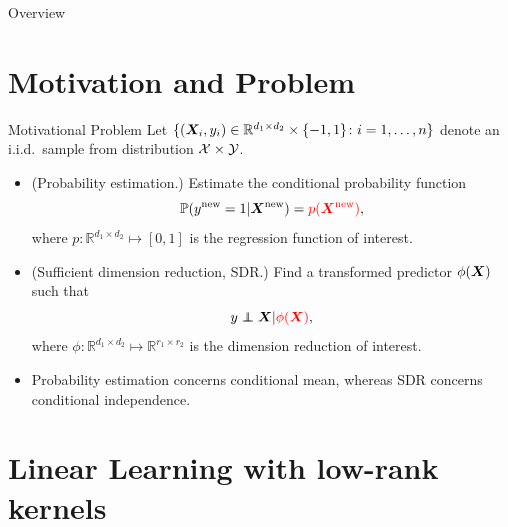 \documentclass[compress,dvipsnames]{beamer}
\let\olditem\item
\renewcommand\item{\olditem\justifying}
\newcommand{\ind}{\perp\!\!\!\!\perp}
\begin{document}
\begin{frame}{Overview}
\tableofcontents
\end{frame}

\section{Motivation and Problem}
\begin{frame}{Motivational Problem}
Let $\{ (\bm{X}_i, y_i) \in \mathbb{R}^{d_1\times d_2}\times \{-1,1\}\colon i=1,\ldots,n\}$ denote an i.i.d.\ sample from distribution ${\mathcal X}\times {\mathcal Y}$. 
\begin{itemize}
\item (Probability estimation.) Estimate the conditional probability function
\[
\mathbb{P}(y^{\text{new}}=1|\bm{X}^{\text{new}})={\color{red}p(\bm{X}^{\text{new}})},
\]
where $p\colon \mathbb{R}^{d_1\times d_2}\mapsto [0,1]$ is the regression function of interest. 
\item (Sufficient dimension reduction, SDR.) Find a transformed predictor $\phi(\bm{X})$ such that
\[
y \ind \mX \large|{\color{red}\phi(\mX)},
\]
where $\phi\colon \mathbb{R}^{d_1\times d_2}\mapsto \mathbb{R}^{r_1\times r_2}$ is the dimension reduction of interest. 
\item Probability estimation concerns {\color{red}conditional mean}, whereas SDR concerns {\color{red}conditional independence}. 
\end{itemize}
\end{frame}

\section{Linear Learning with low-rank kernels}
\end{document}
